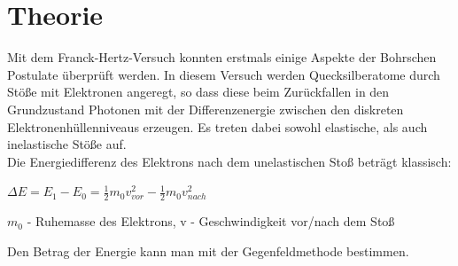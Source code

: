 
\section{Theorie}
Mit dem Franck-Hertz-Versuch konnten erstmals einige Aspekte der Bohrschen Postulate überprüft werden. In diesem Versuch werden Quecksilberatome durch Stöße mit Elektronen angeregt, so dass diese beim Zurückfallen in den Grundzustand Photonen mit der Differenzenergie zwischen den diskreten Elektronenhüllenniveaus erzeugen. Es treten dabei sowohl elastische, als auch inelastische Stöße auf.\\
Die Energiedifferenz des Elektrons nach dem unelastischen Stoß beträgt klassisch:
\begin{formel}[H]
$\Delta E = E_1-E_0 = \frac{1}{2}m_0v_{vor}^2 - \frac{1}{2}m_0v_{nach}^2$
\centering
\caption*{\small{$m_0$ - Ruhemasse des Elektrons, v - Geschwindigkeit vor/nach dem Stoß}}
\end{formel}
Den Betrag der Energie kann man mit der Gegenfeldmethode bestimmen.

